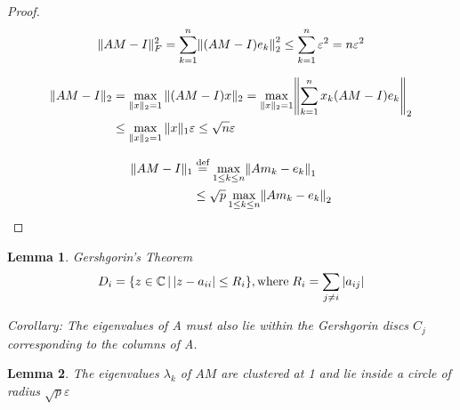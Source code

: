 \documentclass[paper=A4, fontsize=11pt]{scrartcl}
\let\originalleft\left
\let\originalright\right
\renewcommand{\left}{\mathopen{}\mathclose\bgroup\originalleft}
\renewcommand{\right}{\aftergroup\egroup\originalright}
\newtheorem{lemma}{Lemma}
\begin{document}
\begin{proof}

\begin{equation}
\|A M-I\|_{F}^{2}=\sum_{k=1}^{n}\left\|(A M-I) e_{k}\right\|_{2}^{2} \leq \sum_{k=1}^{n} \varepsilon^{2}=n \varepsilon^{2}
\end{equation}

\begin{align}
\|A M-I\|_{2} &=\max _{\|x\|_{2}=1}\|(A M-I) x\|_{2} =\max _{\|x\|_{2}=1}\left\|\sum_{k=1}^{n} x_{k}(A M-I) e_{k}\right\|_{2} \\
&\leq \max _{\|x\|_{2}=1}\|x\|_{1} \varepsilon \leq \sqrt{n} \varepsilon
\end{align}

\begin{align}
\|A M-I\|_{1} &\overset{\text{def}}{=}\max_{1 \leq k \leq n}\left\|A m_k - e_k\right\|_{1} \label{l1matrix} \\
&\leq \sqrt{p} \max_{1 \leq k \leq n}\left\|A m_k - e_k\right\|_{2} 
\end{align}


\end{proof}

\begin{lemma}
	
Gershgorin's Theorem
\begin{equation}\label{gers1}
D_{i}=\left\{z \in \mathbb{C} \, | \, | z-a_{i i} | \leq R_{i}\right\}, \text{where} \; R_{i}=\sum_{j \neq i}\, \left|a_{i j}\right|
\end{equation}

Corollary: The eigenvalues of A must also lie within the Gershgorin discs $C_j$ corresponding to the columns of A. \\


\end{lemma}

\begin{lemma}
The eigenvalues $\lambda_k$ of $AM$ are clustered at 1 and lie inside a circle of radius $\sqrt{p} \varepsilon$
\end{lemma}
\end{document}

